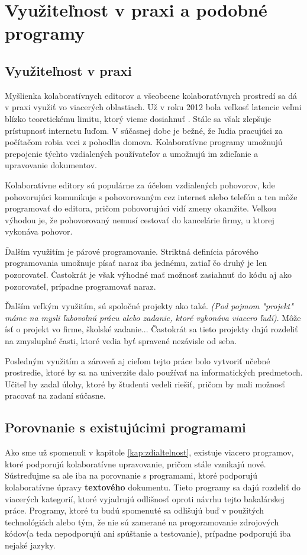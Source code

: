\chapter{Využiteľnost v praxi a podobné programy}

\label{kap:usability_and_similar} %

\section{Využiteľnost v praxi}
Myšlienka kolaboratívnych editorov a všeobecne kolaboratívnych prostredí sa dá v praxi využiť vo 
viacerých oblastiach. Už v roku 2012 bola veľkosť latencie veľmi blízko teoretickému limitu,
ktorý vieme dosiahnuť \cite{latency_bottleneck}. Stále sa však zlepšuje prístupnosť internetu
ľuďom. V súčasnej dobe je bežné, že ľudia pracujúci za počítačom robia veci z pohodlia domova.
Kolaboratívne programy umožnujú prepojenie týchto vzdialených používateľov a umožnujú im zdieľanie
a upravovanie dokumentov.

Kolaboratívne editory sú populárne za účelom vzdialených pohovorov, kde pohovorujúci komunikuje s
pohovorovaným cez internet alebo telefón a ten môže programovať do editora, pričom pohovorujúci 
vidí zmeny okamžite. Veľkou výhodou je, že pohovorovaný nemusí cestovať do kancelárie firmy, u
ktorej vykonáva pohovor.

Ďalším využitím je párové programovanie. Striktná definícia párového programovania umožnuje
písať naraz iba jednému, zatiaľ čo druhý je len pozorovateľ. Častokrát je však výhodné mať možnosť
zasiahnuť do kódu aj ako pozorovateľ, prípadne programovať naraz.

Ďalším veľkým využitím, sú spoločné projekty ako také. \textit{(Pod pojmom "projekt" máme na mysli
ľubovolnú prácu alebo zadanie, ktoré vykonáva viacero ľudí)}. Môže ísť o projekt vo firme, školské
zadanie... Častokrát sa tieto projekty dajú rozdeliť na zmysluplné časti, ktoré vedia byť spravené 
nezávisle od seba.

Posledným využitím a zároveň aj cieľom tejto práce bolo vytvoriť učebné prostredie, ktoré by sa na
univerzite dalo používať na informatických predmetoch. Učiteľ by zadal úlohy, ktoré by študenti
vedeli riešiť, pričom by mali možnosť pracovať na zadaní súčasne.

\section{Porovnanie s existujúcimi programami}
Ako sme už spomenuli v kapitole \ref{kap:zdialtelnost}, existuje viacero programov, ktoré podporujú
kolaboratívne upravovanie, pričom stále vznikajú nové. Sústreďujme sa ale iba na porovnanie s
programami, ktoré podporujú kolaboratívne úpravy \textbf{textového} dokumentu. Tieto programy sa
dajú rozdeliť do viacerých kategorií, ktoré vyjadrujú odlišnosť oproti návrhu tejto bakalárskej
práce. Programy, ktoré tu budú spomenuté sa odlišujú buď v použitých technológiách alebo tým, že nie
sú zamerané na progoramovanie zdrojových kódov(a teda nepodporujú ani spúštanie a testovanie),
prípadne podporujú iba nejaké jazyky.

